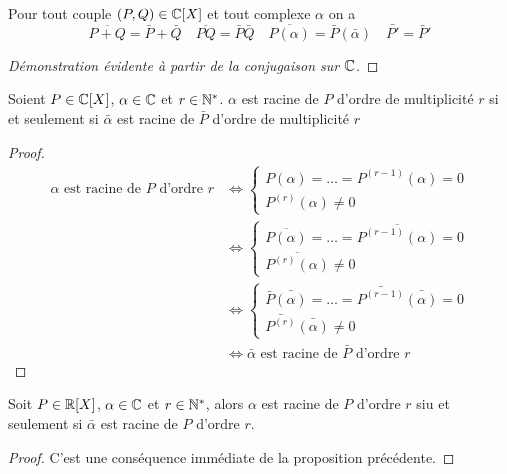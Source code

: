 \begin{prop}
  Pour tout couple \((P,Q) \in \mathbb{C}[X]\) et tout complexe \(\alpha\) on a
  \begin{equation}
    \overline{P+Q}=\bar{P}+\bar{Q} \quad \overline{PQ}=\bar{P}\bar{Q} \quad \overline{P(\alpha)} = \bar{P}(\bar{\alpha}) \quad \bar{P'}=\bar{P}'
  \end{equation}
\end{prop}
\begin{proof}[Démonstration évidente à partir de la conjugaison sur \(\mathbb{C}\)]
\end{proof}

\begin{prop}
  Soient \(P \in \mathbb{C}[X]\), \( \alpha \in \mathbb{C}\) et \(r \in \mathbb{N}^*\). \(\alpha\) est racine de \(P\) d'ordre de multiplicité \(r\) si et seulement si \(\bar{\alpha}\) est racine de \(\bar{P}\) d'ordre de multiplicité \(r\)
\end{prop}
\begin{proof}
  \begin{align}
    \alpha \text{~est racine de~} P \text{~d'ordre~} r &\iff
    \begin{cases}
      P(\alpha) = \ldots = P^{(r-1)}(\alpha)=0\\
      P^{(r)}(\alpha)\neq 0
    \end{cases}\\
    &\iff 
     \begin{cases}
      \overline{P(\alpha)} = \ldots = \overline{P^{(r-1)}(\alpha)}=0\\
      \overline{P^{(r)}(\alpha)}\neq 0
    \end{cases}\\
    &\iff 
     \begin{cases}
      \bar{P}\bar{(\alpha)} = \ldots = \bar{P^{(r-1)}}\bar{(\alpha)}=0\\
      \bar{P^{(r)}}\bar{(\alpha)}\neq 0
    \end{cases}\\
    &\iff \bar{\alpha} \text{~est racine de~} \bar{P} \text{~d'ordre~} r
  \end{align}
\end{proof}

\begin{prop}
  Soit \(P \in \mathbb{R}[X]\), \(\alpha \in \mathbb{C}\) et \(r \in \mathbb{N}^*\), alors \(\alpha\) est racine de \(P\) d'ordre \(r\) siu et seulement si \(\bar{\alpha}\) est racine de \(P\) d'ordre \(r\).
\end{prop}
\begin{proof}
  C'est une conséquence immédiate de la proposition précédente.
\end{proof}

